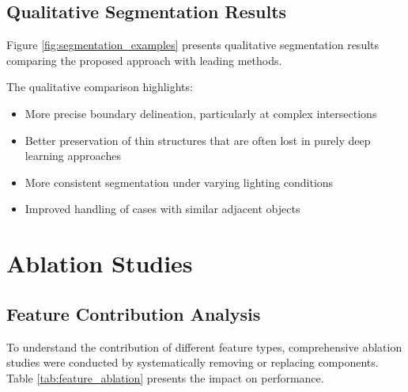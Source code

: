 \subsection{Qualitative Segmentation Results}
Figure \ref{fig:segmentation_examples} presents qualitative segmentation results comparing the proposed approach with leading methods.


The qualitative comparison highlights:

\begin{itemize}
    \item More precise boundary delineation, particularly at complex intersections
    \item Better preservation of thin structures that are often lost in purely deep learning approaches
    \item More consistent segmentation under varying lighting conditions
    \item Improved handling of cases with similar adjacent objects
\end{itemize}

\section{Ablation Studies}

\subsection{Feature Contribution Analysis}
To understand the contribution of different feature types, comprehensive ablation studies were conducted by systematically removing or replacing components. Table \ref{tab:feature_ablation} presents the impact on performance.

